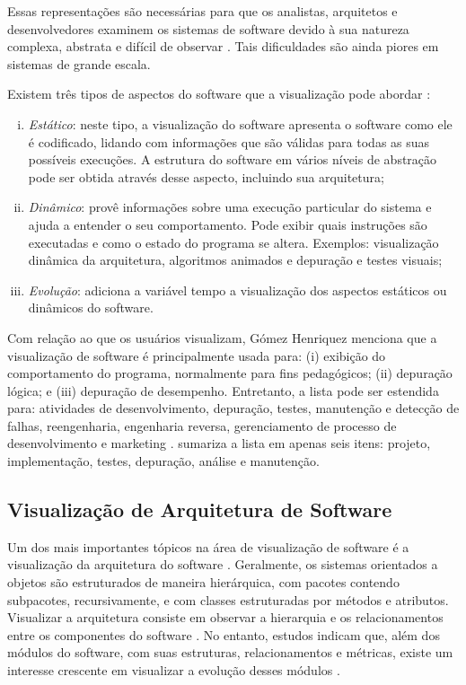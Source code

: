 Essas representações são necessárias para que os analistas, arquitetos e desenvolvedores examinem os sistemas de software devido à sua natureza complexa, abstrata e difícil de observar \cite{Petre2006}. Tais dificuldades são ainda piores em sistemas de grande escala.

Existem três tipos de aspectos do software que a visualização pode abordar \cite{Diehl2007}:
\begin{enumerate}[(i)]
	\item \textit{Estático}: neste tipo, a visualização do software apresenta o software como ele é codificado, lidando com informações que são válidas para todas as suas possíveis execuções. A estrutura do software em vários níveis de abstração pode ser obtida através desse aspecto, incluindo sua arquitetura;
	\item \textit{Dinâmico}: provê informações sobre uma execução particular do sistema e ajuda a entender o seu comportamento. Pode exibir quais instruções são executadas e como o estado do programa se altera. Exemplos: visualização dinâmica da arquitetura, algoritmos animados e depuração e testes visuais;
	\item \textit{Evolução}: adiciona a variável tempo a visualização dos aspectos estáticos ou dinâmicos do software.
\end{enumerate}

Com relação ao que os usuários visualizam, Gómez Henriquez \cite{Gomez-Henriquez2001a} menciona que a visualização de software é principalmente usada para: (i) exibição do comportamento do programa, normalmente para fins pedagógicos; (ii) depuração lógica; e (iii) depuração de desempenho. Entretanto, a lista pode ser estendida para: atividades de desenvolvimento, depuração, testes, manutenção e detecção de falhas, reengenharia, engenharia reversa, gerenciamento de processo de desenvolvimento e marketing \cite{Maletic2002}. \citeauthor{Diehl2007} sumariza a lista em apenas seis itens: projeto, implementação, testes, depuração, análise e manutenção.

\subsection{Visualização de Arquitetura de Software} \label{subsec:visualizacao-arquitetura-software}

Um dos mais importantes tópicos na área de visualização de software é a visualização da arquitetura do software \cite{Ghanam2008}\cite{Denford2002}\cite{Gallagher2005}\cite{Gallagher2008}. Geralmente, os sistemas orientados a objetos são estruturados de maneira hierárquica, com pacotes contendo subpacotes, recursivamente, e com classes estruturadas por métodos e atributos. Visualizar a arquitetura consiste em observar a hierarquia e os relacionamentos entre os componentes do software \cite{Caserta2011}. No entanto, estudos indicam que, além dos módulos do software, com suas estruturas, relacionamentos e métricas, existe um interesse crescente em visualizar a evolução desses módulos \cite{Ambros2007}.

